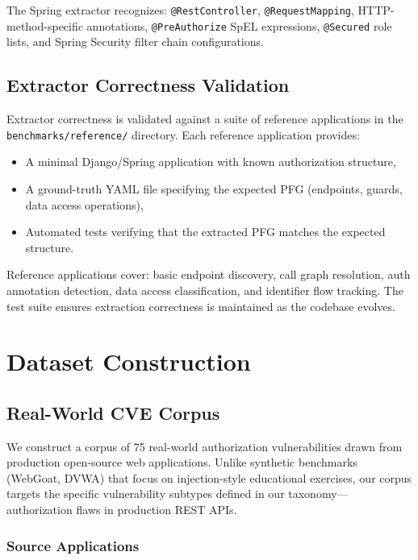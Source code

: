 The Spring extractor recognizes: \texttt{@RestController}, \texttt{@RequestMapping}, HTTP-method-specific annotations, \texttt{@PreAuthorize} SpEL expressions, \texttt{@Secured} role lists, and Spring Security filter chain configurations.

\subsection{Extractor Correctness Validation}

Extractor correctness is validated against a suite of reference applications in the \texttt{benchmarks/reference/} directory. Each reference application provides:
\begin{itemize}
    \item A minimal Django/Spring application with known authorization structure,
    \item A ground-truth YAML file specifying the expected PFG (endpoints, guards, data access operations),
    \item Automated tests verifying that the extracted PFG matches the expected structure.
\end{itemize}

Reference applications cover: basic endpoint discovery, call graph resolution, auth annotation detection, data access classification, and identifier flow tracking. The test suite ensures extraction correctness is maintained as the codebase evolves.

\section{Dataset Construction}
\label{sec:dataset}

\subsection{Real-World CVE Corpus}

We construct a corpus of 75 real-world authorization vulnerabilities drawn from production open-source web applications. Unlike synthetic benchmarks (WebGoat, DVWA) that focus on injection-style educational exercises, our corpus targets the specific vulnerability subtypes defined in our taxonomy—authorization flaws in production REST APIs.

\subsubsection{Source Applications}

